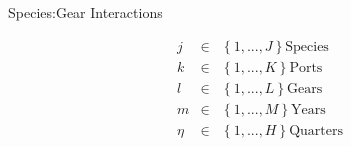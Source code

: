 \documentclass[ xcolor = pdftex, dvipsnames, table ]{beamer}
\begin{document}
\begin{frame}{Species:Gear Interactions}
\begin{minipage}[h!]{0.39\textwidth}
\end{minipage}
\begin{minipage}{0.3\textwidth}
\begin{eqnarray*}
j &\in&\left\{1, ..., J\right\} \text{Species}\\
k &\in&\left\{1, ..., K\right\} \text{Ports}\\
l &\in&\left\{1, ..., L\right\} \text{Gears}\\
m &\in&\left\{1, ..., M\right\} \text{Years}\\
\eta &\in&\left\{1, ..., H\right\} \text{Quarters}
\end{eqnarray*}
\end{minipage}
\end{frame}

%
%
\end{document}
